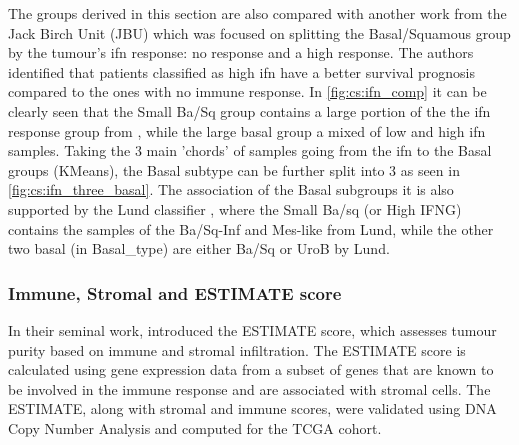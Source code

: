 The groups derived in this section are also compared with another work \citet{Baker2022-bj} from the Jack Birch Unit (JBU) which was focused on splitting the Basal/Squamous group by the tumour's \acrfull{ifn} response: no response and a high response. The authors identified that patients classified as high \acrshort{ifn} have a better survival prognosis compared to the ones with no immune response. In \cref{fig:cs:ifn_comp} it can be clearly seen that the Small Ba/Sq group contains a large portion of the the \acrshort{ifn} response group from \citet{Baker2022-bj}, while the large basal group a mixed of low and high \acrshort{ifn} samples. Taking the 3 main 'chords' of samples going from the \acrshort{ifn} to the Basal groups (KMeans), the Basal subtype can be further split into 3 as seen in \cref{fig:cs:ifn_three_basal}. The association of the Basal subgroups it is also supported by the Lund classifier \citet{Marzouka2018-ge}, where the Small Ba/sq (or High IFNG) contains the samples of the Ba/Sq-Inf and Mes-like from Lund, while the other two basal (in Basal\_type) are either Ba/Sq or UroB by Lund.

\subsubsection{Immune, Stromal and ESTIMATE score}

In their seminal work, \citet{Yoshihara2013-wq} introduced the ESTIMATE score, which assesses tumour purity based on immune and stromal infiltration. The ESTIMATE score is calculated using gene expression data from a subset of genes that are known to be involved in the immune response and are associated with stromal cells. The ESTIMATE, along with stromal and immune scores, were validated using DNA Copy Number Analysis and computed for the TCGA cohort.

